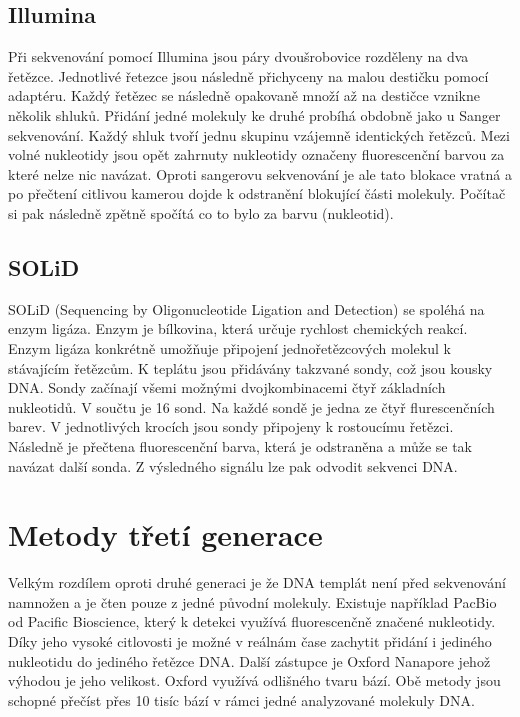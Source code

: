 \documentclass[czech,DP]{thesiskiv}
\numberwithin{equation}{section}
\begin{document}
\subsection{Illumina}
Při sekvenování pomocí Illumina jsou páry dvoušrobovice rozděleny na dva řetězce. Jednotlivé řetezce jsou následně přichyceny na malou destičku pomocí adaptéru. Každý řetězec se následně opakovaně množí až na destičce vznikne několik shluků. Přidání jedné molekuly ke druhé probíhá obdobně jako u Sanger sekvenování. Každý shluk tvoří jednu skupinu vzájemně identických řetězců. Mezi volné nukleotidy jsou opět zahrnuty nukleotidy označeny fluorescenční barvou za které nelze nic navázat. Oproti sangerovu sekvenování je ale tato blokace vratná a po přečtení citlivou kamerou dojde k odstranění blokující části molekuly. Počítač si pak následně zpětně spočítá co to bylo za barvu (nukleotid). \cite{illumina} \cite{sekvenovani_ziva} 


\subsection{SOLiD}
SOLiD (Sequencing by Oligonucleotide Ligation and Detection) se spoléhá na enzym ligáza. Enzym je bílkovina, která určuje rychlost chemických reakcí. Enzym ligáza konkrétně umožňuje připojení jednořetězcových molekul k stávajícím řetězcům. K teplátu jsou přidávány takzvané sondy, což jsou kousky DNA. Sondy začínají všemi možnými dvojkombinacemi čtyř základních nukleotidů. V součtu je 16 sond. Na každé sondě je jedna ze čtyř flurescenčních barev. V jednotlivých krocích jsou sondy připojeny k rostoucímu řetězci. Následně je přečtena fluorescenční barva, která je odstraněna a může se tak navázat další sonda. Z výsledného signálu lze pak odvodit sekvenci DNA.


\section{Metody třetí generace}
Velkým rozdílem oproti druhé generaci je že DNA templát není před sekvenování namnožen a je čten pouze z jedné původní molekuly. Existuje například PacBio od Pacific Bioscience, který k detekci využívá fluorescenčně značené nukleotidy. Díky jeho vysoké citlovosti je možné v reálnám čase zachytit přidání i jediného nukleotidu do jediného řetězce DNA. Další zástupce je Oxford Nanapore jehož výhodou je jeho velikost. Oxford využívá odlišného tvaru bází. Obě metody jsou schopné přečíst přes 10 tisíc bází v rámci jedné analyzované molekuly DNA. 
\end{document}
